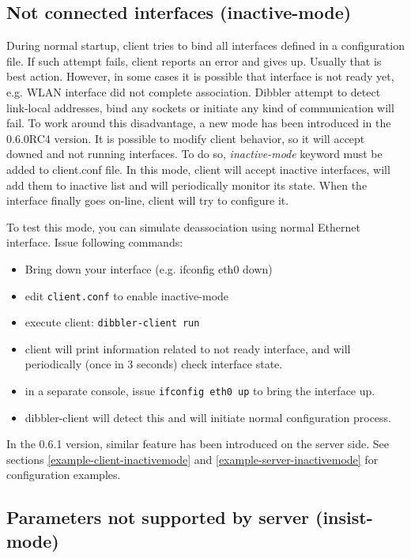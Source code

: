 \begin{enumerate}
\subsection{Not connected interfaces (inactive-mode)}
\label{feature-inactive-mode}
During normal startup, client tries to bind all interfaces defined in
a configuration file. If such attempt fails, client reports an error
and gives up. Usually that is best action. However, in some cases it
is possible that interface is not ready yet, e.g. WLAN interface did
not complete association. Dibbler attempt to detect link-local
addresses, bind any sockets or initiate any kind of communication will
fail. To work around this disadvantage, a new mode has been
introduced in the 0.6.0RC4 version. It is possible to modify client
behavior, so it will accept downed and not running interfaces. To do
so, \emph{inactive-mode} keyword must be added to client.conf file. In
this mode, client will accept inactive interfaces, will add them to
inactive list and will periodically monitor its state. When the
interface finally goes on-line, client will try to configure it.

To test this mode, you can simulate deassociation using normal
Ethernet interface. Issue following commands:

\begin{itemize}
\item Bring down your interface (e.g. ifconfig eth0 down)
\item edit \verb+client.conf+ to enable inactive-mode
\item execute client: \verb+dibbler-client run+
\item client will print information related to not ready interface,
  and will periodically (once in 3 seconds) check interface state.
\item in a separate console, issue \verb+ifconfig eth0 up+ to bring
  the interface up.
\item dibbler-client will detect this and will initiate normal
  configuration process.
\end{itemize}

In the 0.6.1 version, similar feature has been introduced on the
server side. See sections \ref{example-client-inactivemode} and
\ref{example-server-inactivemode} for configuration examples.

\subsection{Parameters not supported by server (insist-mode)}
\label{feature-insist-mode}


\end{enumerate}
